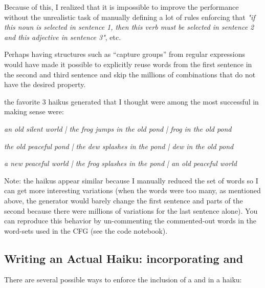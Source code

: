 \begin{enumarabic}
    Because of this, I realized that it is impossible to improve the performance
    without the unrealistic task of manually defining a lot of rules enforcing
    that \emph{"if this noun is selected in sentence 1, then this verb must be selected in sentence 2
    and this adjective in sentence 3"}, etc.

    Perhaps having structures such as ``capture groups'' from regular expressions
    would have made it possible to explicitly reuse words from the first sentence
    in the second and third sentence and skip the millions of combinations that
    do not have the desired property.

  \item the favorite $3$ haikus generated that I thought were among the most successful
    in making sense were:
    \begin{enumroman}
      \item \emph{an old silent world | the frog jumps in the old pond | frog in the old pond}
      \item \emph{the old peaceful pond | the dew splashes in the pond | dew in the old pond}
      \item \emph{a new peaceful world | the frog splashes in the pond | an old peaceful world}
    \end{enumroman}
    Note: the haikus appear similar because I manually reduced the set of words so I can
    get more interesting variations (when the words were too many, as mentioned above,
    the generator would barely change the first sentence and parts of the second
    because there were millions of variations for the last sentence alone).
    You can reproduce this behavior by un-commenting the commented-out words in the
    word-sets used in the CFG (see the code notebook).
\end{enumarabic}

\newpage
\subsection{Writing an Actual Haiku: incorporating  and }

There are several possible ways to enforce the inclusion
of a  and  in a haiku:


